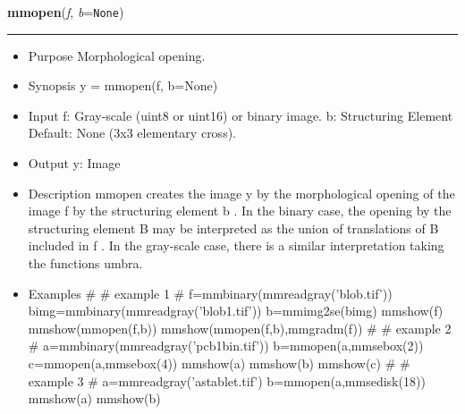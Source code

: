     \begin{boxedminipage}{\textwidth}

    \raggedright \textbf{mmopen}(\textit{f}, \textit{b}=\texttt{N\-o\-n\-e\-})

    \vspace{-1.5ex}

    \rule{\textwidth}{0.5\fboxrule}
    \begin{itemize}
    \setlength{\parskip}{0.6ex}
      \item Purpose Morphological opening.

      \item Synopsis y = mmopen(f, b=None)

      \item Input f: Gray-scale (uint8 or uint16) or binary image. b: 
        Structuring Element Default: None (3x3 elementary cross).

      \item Output y: Image

      \item Description mmopen creates the image y by the morphological 
        opening of the image f by the structuring element b . In the 
        binary case, the opening by the structuring element B may be 
        interpreted as the union of translations of B included in f . In 
        the gray-scale case, there is a similar interpretation taking the 
        functions umbra.

      \item Examples \# \# example 1 \# f=mmbinary(mmreadgray('blob.tif')) 
        bimg=mmbinary(mmreadgray('blob1.tif')) b=mmimg2se(bimg) mmshow(f) 
        mmshow(mmopen(f,b)) mmshow(mmopen(f,b),mmgradm(f)) \# \# example 
        2 \# a=mmbinary(mmreadgray('pcb1bin.tif')) b=mmopen(a,mmsebox(2)) 
        c=mmopen(a,mmsebox(4)) mmshow(a) mmshow(b) mmshow(c) \# \# 
        example 3 \# a=mmreadgray('astablet.tif') 
        b=mmopen(a,mmsedisk(18)) mmshow(a) mmshow(b)

    \end{itemize}

    \vspace{1ex}

    \end{boxedminipage}

    \label{multireg:num_pymorph:mmopenrec}
    \vspace{0.5ex}

